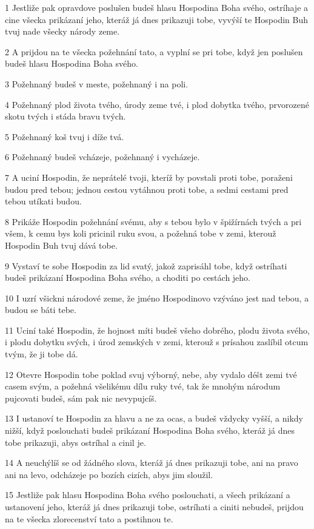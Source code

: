 \par 1 Jestliže pak opravdove poslušen budeš hlasu Hospodina Boha svého, ostríhaje a cine všecka prikázaní jeho, kteráž já dnes prikazuji tobe, vyvýší te Hospodin Buh tvuj nade všecky národy zeme.
\par 2 A prijdou na te všecka požehnání tato, a vyplní se pri tobe, když jen poslušen budeš hlasu Hospodina Boha svého.
\par 3 Požehnaný budeš v meste, požehnaný i na poli.
\par 4 Požehnaný plod života tvého, úrody zeme tvé, i plod dobytka tvého, prvorozené skotu tvých i stáda bravu tvých.
\par 5 Požehnaný koš tvuj i díže tvá.
\par 6 Požehnaný budeš vcházeje, požehnaný i vycházeje.
\par 7 A uciní Hospodin, že neprátelé tvoji, kteríž by povstali proti tobe, poraženi budou pred tebou; jednou cestou vytáhnou proti tobe, a sedmi cestami pred tebou utíkati budou.
\par 8 Prikáže Hospodin požehnání svému, aby s tebou bylo v špižírnách tvých a pri všem, k cemu bys koli pricinil ruku svou, a požehná tobe v zemi, kterouž Hospodin Buh tvuj dává tobe.
\par 9 Vystaví te sobe Hospodin za lid svatý, jakož zaprisáhl tobe, když ostríhati budeš prikázaní Hospodina Boha svého, a choditi po cestách jeho.
\par 10 I uzrí všickni národové zeme, že jméno Hospodinovo vzýváno jest nad tebou, a budou se báti tebe.
\par 11 Uciní také Hospodin, že hojnost míti budeš všeho dobrého, plodu života svého, i plodu dobytku svých, i úrod zemských v zemi, kterouž s prísahou zaslíbil otcum tvým, že ji tobe dá.
\par 12 Otevre Hospodin tobe poklad svuj výborný, nebe, aby vydalo déšt zemi tvé casem svým, a požehná všelikému dílu ruky tvé, tak že mnohým národum pujcovati budeš, sám pak nic nevypujcíš.
\par 13 I ustanoví te Hospodin za hlavu a ne za ocas, a budeš vždycky vyšší, a nikdy nižší, když poslouchati budeš prikázaní Hospodina Boha svého, kteráž já dnes tobe prikazuji, abys ostríhal a cinil je.
\par 14 A neuchýlíš se od žádného slova, kteráž já dnes prikazuji tobe, ani na pravo ani na levo, odcházeje po bozích cizích, abys jim sloužil.
\par 15 Jestliže pak hlasu Hospodina Boha svého poslouchati, a všech prikázaní a ustanovení jeho, kteráž já dnes prikazuji tobe, ostríhati a ciniti nebudeš, prijdou na te všecka zlorecenství tato a postihnou te.
